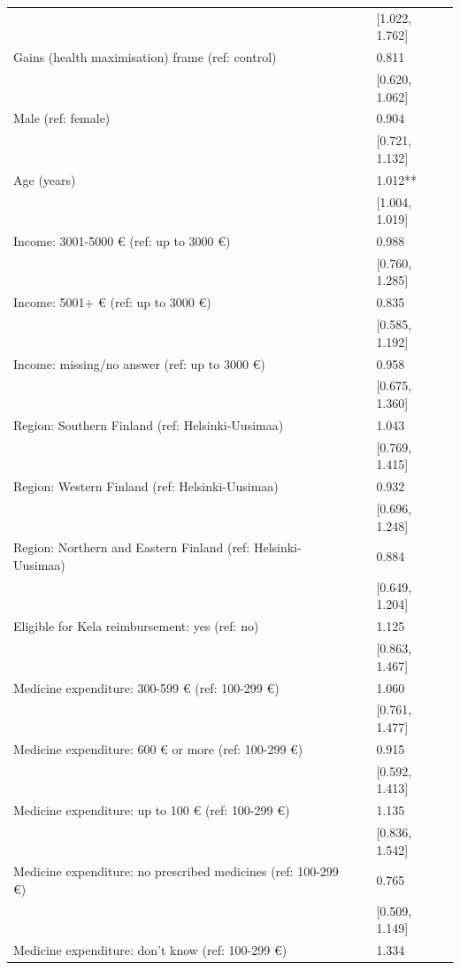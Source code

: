\begin{tabular}{lll}
&  & [\num{1.022}, \num{1.762}] \\
Gains (health maximisation) frame (ref: control) &  & \num{0.811} \\
&  & [\num{0.620}, \num{1.062}] \\
Male (ref: female) &  & \num{0.904} \\
&  & [\num{0.721}, \num{1.132}] \\
Age (years) &  & \num{1.012}** \\
&  & [\num{1.004}, \num{1.019}] \\
Income: 3001-5000 € (ref: up to 3000 €) &  & \num{0.988} \\
&  & [\num{0.760}, \num{1.285}] \\
Income: 5001+ € (ref: up to 3000 €) &  & \num{0.835} \\
&  & [\num{0.585}, \num{1.192}] \\
Income: missing/no answer (ref: up to 3000 €) &  & \num{0.958} \\
&  & [\num{0.675}, \num{1.360}] \\
Region: Southern Finland (ref: Helsinki-Uusimaa) &  & \num{1.043} \\
&  & [\num{0.769}, \num{1.415}] \\
Region: Western Finland (ref: Helsinki-Uusimaa) &  & \num{0.932} \\
&  & [\num{0.696}, \num{1.248}] \\
Region: Northern and Eastern Finland (ref: Helsinki-Uusimaa) &  & \num{0.884} \\
&  & [\num{0.649}, \num{1.204}] \\
Eligible for Kela reimbursement: yes (ref: no) &  & \num{1.125} \\
&  & [\num{0.863}, \num{1.467}] \\
Medicine expenditure: 300-599 € (ref: 100-299 €) &  & \num{1.060} \\
&  & [\num{0.761}, \num{1.477}] \\
Medicine expenditure: 600 € or more (ref: 100-299 €) &  & \num{0.915} \\
&  & [\num{0.592}, \num{1.413}] \\
Medicine expenditure: up to 100 € (ref: 100-299 €) &  & \num{1.135} \\
&  & [\num{0.836}, \num{1.542}] \\
Medicine expenditure: no prescribed medicines (ref: 100-299 €) &  & \num{0.765} \\
&  & [\num{0.509}, \num{1.149}] \\
Medicine expenditure: don't know (ref: 100-299 €) &  & \num{1.334} \\

\end{tabular}
